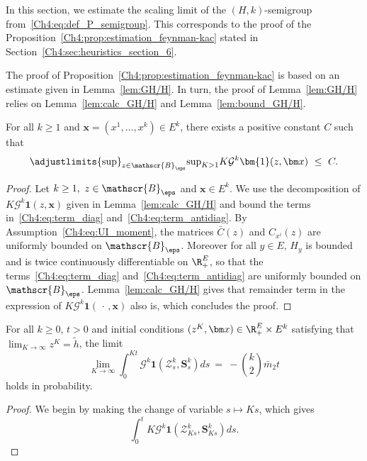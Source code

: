 \begin{refsegment}
In this section, we estimate the scaling limit of the $(H,k)$-semigroup from~\eqref{Ch4:eq:def_P_semigroup}. This corresponds to the proof of the Proposition~\ref{Ch4:prop:estimation_feynman-kac} stated in Section~\ref{Ch4:sec:heuristics_section_6}.

The proof of Proposition~\ref{Ch4:prop:estimation_feynman-kac}  is based on an estimate given in 
Lemma~\ref{lem:GH/H}.
In turn, the proof of Lemma~\ref{lem:GH/H} relies on Lemma~\ref{lem:calc_GH/H} and  Lemma~\ref{lem:bound_GH/H}. 
\begin{lem}\label{lem:bound_GH/H}
For all $k\geq 1$ and $\bm x= (x^1, \ldots, x^k)\in E^k$, 
there exists a positive constant $C$ such that 
\begin{equation*}
\adjustlimits{\sup}_{z\in\mathscr{B}_\eps}{\sup}_{K>1}K\mathcal{G}^k\bm{1}(z, \bm x) \ \leq\  C.
\end{equation*}
\end{lem}
\begin{proof}
Let $k\geq 1,\ z\in\mathscr{B}_{\eps}$ and $\bm x\in E^k$. We use the decomposition of $K\mathcal{G}^k\bm{1}(z, \bm x)$ given in Lemma~\ref{lem:calc_GH/H} and bound the terms in~\eqref{Ch4:eq:term_diag} and~\eqref{Ch4:eq:term_antidiag}.
By Assumption~\ref{Ch4:eq:UI_moment}, the matrices $\bar C(z)$ and $C_{x^i}(z)$ are uniformly bounded on $\mathscr{B}_\eps$. Moreover for all $y\in E$, $H_{y}$ is bounded and is twice continuously differentiable on $\R_+^E$, so that the terms~\eqref{Ch4:eq:term_diag} and~\eqref{Ch4:eq:term_antidiag}
are uniformly bounded on $\mathscr{B}_\eps$. Lemma~\ref{lem:calc_GH/H} gives that remainder term in the expression of $K\mathcal{G}^k\bm{1}(\,\cdot\,, \bm x)$ also is, which concludes the proof.
\end{proof}

  \begin{lem}\label{lem:GH/H}
        For all $k\geq 0$, $t>0$ and initial conditions $(z^K,\bm x)\in \R_+^E\times E^k$ satisfying that $\lim_{K\to\infty}z^K =\tilde h$, the limit
  \begin{equation}\label{Ch4:eq:GH/H}
\lim_{K\to\infty }\int_{0}^{Kt} \mathcal{G}^k\bm{1}(\mathcal{Z}^k_{s}, \bm S^k_s) ds\  =\  - \binom{k}{2} \bar m_2 t
\end{equation}
holds in probability.
\end{lem}

\begin{proof}
  We begin by making the change of variable $s\mapsto Ks$, which gives
  \[
\int_{0}^t K\mathcal{G}^k\bm{1}(\mathcal{Z}^k_{Ks}, \bm S^k_{Ks}) ds.
  \]


\end{proof}
\end{refsegment}
